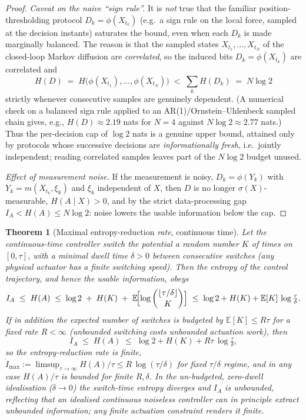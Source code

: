\documentclass{amsart}
\newtheorem{theorem}{Theorem}
\theoremstyle{definition}
\newcommand{\E}{\mathbb{E}}
\begin{document}
\begin{proof}
\emph{Caveat on the naive ``sign rule''.} It is \emph{not} true that the
familiar position-thresholding protocol $D_k=\phi(X_{t_k})$ (e.g.\ a sign rule
on the local force, sampled at the decision instants) saturates the bound, even
when each $D_k$ is made marginally balanced. The reason is that the sampled
states $X_{t_1},\dots,X_{t_N}$ of the closed-loop Markov diffusion are
\emph{correlated}, so the induced bits $D_k=\phi(X_{t_k})$ are correlated and
\[
H(D)\;=\;H\bigl(\phi(X_{t_1}),\dots,\phi(X_{t_N})\bigr)\;<\;\sum_k H(D_k)\;=\;N\log2
\]
strictly whenever consecutive samples are genuinely dependent. (A numerical
check on a balanced sign rule applied to an AR(1)/Ornstein--Uhlenbeck sampled
chain gives, e.g., $H(D)\approx 2.19$ nats for $N=4$ against $N\log2\approx2.77$
nats.) Thus the per-decision cap of $\log2$ nats is a genuine upper bound,
attained only by protocols whose successive decisions are \emph{informationally
fresh}, i.e.\ jointly independent; reading correlated samples leaves part of the
$N\log2$ budget unused.

\emph{Effect of measurement noise.} If the measurement is noisy,
$D_k=\phi(Y_k)$ with $Y_k=m(X_{t_k},\xi_k)$ and $\xi_k$ independent of $X$, then
$D$ is no longer $\sigma(X)$-measurable, $H(A\mid X)>0$, and by the strict
data-processing gap $I_A<H(A)\le N\log2$: noise lowers the usable information
below the cap.
\end{proof}

\begin{theorem}[Maximal entropy-reduction \emph{rate}, continuous time]
\label{thm:Imax-cont}
Let the continuous-time controller switch the potential a random number $K$ of
times on $[0,\tau]$, with a minimal dwell time $\delta>0$ between consecutive
switches (any physical actuator has a finite switching speed). Then the
entropy of the control trajectory, and hence the usable information, obeys
\begin{equation}\label{eq:Icont2}
I_A\;\le\;H(A)\;\le\; \log 2 \;+\; H(K)\;+\;
\E\!\Bigl[\log\binom{\lfloor\tau/\delta\rfloor}{K}\Bigr]
\;\le\;\log 2 + H(K) + \E[K]\,\log\tfrac{\tau}{\delta}.
\end{equation}
If in addition the expected number of switches is budgeted by $\E[K]\le R\tau$
for a fixed rate $R<\infty$ (unbounded switching costs unbounded actuation
work), then
\begin{equation}\label{eq:Icont}
I_A\;\le\;H(A)\;\le\; \log2 + H(K) + R\tau\,\log\tfrac{\tau}{\delta},
\end{equation}
so the entropy-reduction \emph{rate} is finite,
$\dot I_{\max}:=\limsup_{\tau\to\infty}H(A)/\tau \le R\,\log(\tau/\delta)$ for
fixed $\tau/\delta$ regime, and in any case $H(A)/\tau$ is bounded for finite
$R,\delta$. In the un-budgeted, zero-dwell idealisation ($\delta\to0$) the
switch-time entropy diverges and $I_A$ is unbounded, reflecting that an
idealised continuous noiseless controller can in principle extract unbounded
information; any finite actuation constraint renders it finite.
\end{theorem}
\end{document}
